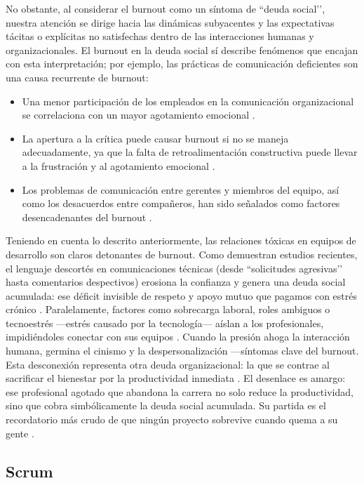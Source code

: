No obstante, al considerar el burnout como un síntoma de ``deuda social’’, nuestra atención se dirige hacia las dinámicas subyacentes y las expectativas tácitas o explícitas no satisfechas dentro de las interacciones humanas y organizacionales. El burnout en la deuda social sí describe fenómenos que encajan con esta interpretación; por ejemplo, las prácticas de comunicación deficientes son una causa recurrente de burnout:
\begin{itemize}
    \item Una menor participación de los empleados en la comunicación organizacional se correlaciona con un mayor agotamiento emocional \cite{tulili2022burnout}.
    \item La apertura a la crítica puede causar burnout si no se maneja adecuadamente, ya que la falta de retroalimentación constructiva puede llevar a la frustración y al agotamiento emocional \cite{tulili2022burnout}.
    \item Los problemas de comunicación entre gerentes y miembros del equipo, así como los desacuerdos entre compañeros, han sido señalados como factores desencadenantes del burnout \cite{tulili2022burnout}.
\end{itemize}
Teniendo en cuenta lo descrito anteriormente, las relaciones tóxicas en equipos de desarrollo son claros detonantes de burnout. Como demuestran estudios recientes, el lenguaje descortés en comunicaciones técnicas (desde ``solicitudes agresivas’’ hasta comentarios despectivos) erosiona la confianza y genera una deuda social acumulada: ese déficit invisible de respeto y apoyo mutuo que pagamos con estrés crónico \cite{tulili2022burnout}.
Paralelamente, factores como sobrecarga laboral, roles ambiguos o tecnoestrés —estrés causado por la tecnología— aíslan a los profesionales, impidiéndoles conectar con sus equipos \cite{tulili2022burnout}. Cuando la presión ahoga la interacción humana, germina el cinismo y la despersonalización —síntomas clave del burnout. Esta desconexión representa otra deuda organizacional: la que se contrae al sacrificar el bienestar por la productividad inmediata \cite{tulili2022burnout}.
El desenlace es amargo: ese profesional agotado que abandona la carrera no solo reduce la productividad, sino que cobra simbólicamente la deuda social acumulada. Su partida es el recordatorio más crudo de que ningún proyecto sobrevive cuando quema a su gente \cite{tulili2022burnout}.


\subsection{Scrum}
